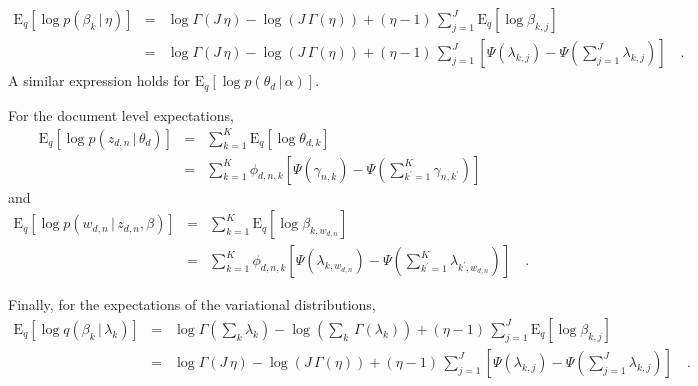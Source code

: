 \documentclass[11pt]{article}
\newcommand{\expect}[2]{\ensuremath{\mathrm{E}_{#1}\left [ {#2} \right ]}}
\begin{document}
\begin{eqnarray}
\expect{q}{\log p(\beta_k\,|\,\eta)} &=&
\log \Gamma (J\,\eta) - \log \left ( J\,\Gamma(\eta) \right )
+ (\eta-1)\,\sum_{j=1}^J \expect{q}{\log\beta_{k,j}} \nonumber\\
&=&
\log \Gamma (J\,\eta) - \log \left ( J\,\Gamma(\eta) \right )
+ (\eta-1)\,\sum_{j=1}^J \left[ \Psi (\lambda_{k,j})
- \Psi({\textstyle\sum}_{j=1}^J \lambda_{k,j}) \right] \quad.
\end{eqnarray}
A similar expression holds for $\expect{q}{\log p(\theta_d\,|\,\alpha)}$.

For the document level expectations,
\begin{eqnarray}
\expect{q}{\log p(z_{d,n}\,|\,\theta_d)} &=&
\sum_{k=1}^K
\expect{q}{\log \theta_{d,k}} \nonumber \\
&=&
\sum_{k=1}^K
\phi_{d,n,k}
\left[\Psi (\gamma_{n,k}) - \Psi({\textstyle\sum}_{k^\prime=1}^K
\gamma_{n,k^\prime})
\right]
\end{eqnarray}
and
\begin{eqnarray}
\expect{q}{\log p(w_{d,n}\,|\,z_{d,n},\beta)} &=&
\sum_{k=1}^K
\expect{q}{\log \beta_{k,w_{d,n}}} \nonumber\\
&=&
\sum_{k=1}^K
\phi_{d,n,k}
\left[
\Psi (\lambda_{k,w_{d,n}})
- \Psi({\textstyle\sum}_{k^\prime=1}^K \lambda_{k^\prime,w_{d,n}})
\right] \quad.
\end{eqnarray}

Finally, for the expectations of the variational distributions,
\begin{eqnarray}
\expect{q}{\log q(\beta_k\,|\,\lambda_k)} &=&
\log \Gamma (\sum_k\lambda_k) - \log \left ( \sum_k\,\Gamma(\lambda_k) \right )
+ (\eta-1)\,\sum_{j=1}^J \expect{q}{\log\beta_{k,j}} \nonumber\\
&=&
\log \Gamma (J\,\eta) - \log \left ( J\,\Gamma(\eta) \right )
+ (\eta-1)\,\sum_{j=1}^J \left[ \Psi (\lambda_{k,j})
- \Psi({\textstyle\sum}_{j=1}^J \lambda_{k,j}) \right] \quad.
\end{eqnarray}
\end{document}
